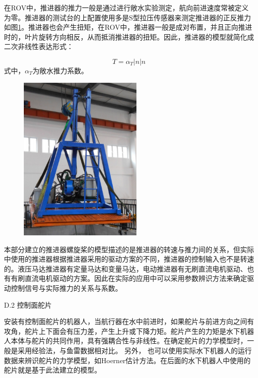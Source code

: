 在ROV中，推进器的推力一般是通过进行敞水实验测定，航向前进速度常被定义为零。推进器的测试台的上配置使用多是S型拉压传感器来测定推进器的正反推力如图\ref{fig:chap2:F2}。推进器也会产生扭矩，在ROV中，推进器一般是成对布置，并且正向推进时的，叶片旋转方向相反，从而抵消推进器的扭矩。因此，推进器的模型就简化成二次非线性表达形式：

\begin{equation}
\label{eq:chap2:29}
T = \alpha_T \left|n\right| n
\end{equation}
式中，$\alpha_T$为敞水推力系数。

\begin{figure}
\label{fig:chap2:F2}
\centering
\includegraphics[width = 6cm]{figure/chap2/propellerTest.png}
\end{figure}
本部分建立的推进器螺旋桨的模型描述的是推进器的转速与推力间的关系，但实际中使用的推进器根据推进器采用的驱动方案的不同，推进器的控制输入也不是转速的。液压马达推进器有定量马达和变量马达，电动推进器有无刷直流电机驱动、也有有刷直流电机驱动的方案。因此在实际的应用中可以采用参数辨识方法来确定驱动控制信号与实际推力的关系与系数\cite{wu2016parametric}。

D.2 控制面舵片

安装有控制面舵片的机器人，当航行器在水中前进时，如果舵片与前进方向之间有攻角，舵片上下面会有压力差，产生上升或下降力矩。舵片产生的力矩是水下机器人本体与舵片的共同作用，具有强耦合性与非线性。在确定舵片的力学模型时，一般是采用经验法，与鱼雷数据相对比\cite{bottaccini1954stablity,John1978Methods,Borst1985Fluid}。 另外， 也可以使用实际水下机器人的运行数据来辨识舵片的力学模型，如Hoerner估计方法\cite{Borst1985Fluid}。在后面的水下机器人中使用的舵片就是基于此法建立的模型。

